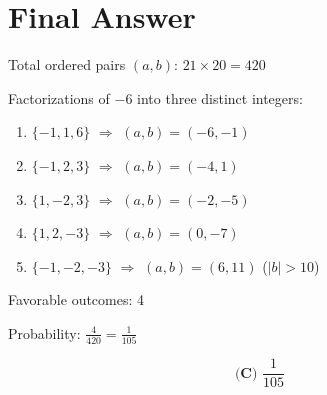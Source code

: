 \documentclass[12pt]{article}
\begin{document}
\section*{Final Answer}

Total ordered pairs $(a,b)$: $21 \times 20 = 420$

Factorizations of $-6$ into three distinct integers:
\begin{enumerate}
    \item $\{-1, 1, 6\}$ $\Rightarrow$ $(a,b) = (-6, -1)$ \checkmark
    \item $\{-1, 2, 3\}$ $\Rightarrow$ $(a,b) = (-4, 1)$ \checkmark
    \item $\{1, -2, 3\}$ $\Rightarrow$ $(a,b) = (-2, -5)$ \checkmark
    \item $\{1, 2, -3\}$ $\Rightarrow$ $(a,b) = (0, -7)$ \checkmark
    \item $\{-1, -2, -3\}$ $\Rightarrow$ $(a,b) = (6, 11)$ \texttimes ($|b| > 10$)
\end{enumerate}

Favorable outcomes: 4

Probability: $\displaystyle \frac{4}{420} = \frac{1}{105}$

$$\boxed{\textbf{(C) } \frac{1}{105}}$$
\end{document}
